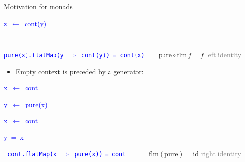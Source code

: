 \documentclass[english]{beamer}
\newenvironment{lyxcode}
   {\par\begin{list}{}{
     \setlength{\rightmargin}{\leftmargin}
     \setlength{\listparindent}{0pt}%
     \raggedright
     \setlength{\itemsep}{0pt}
     \setlength{\parsep}{0pt}
     \normalfont\ttfamily}%
    \def\{{\char`\{}
    \def\}{\char`\}}
    \def\textasciitilde{\char`\~}
    \item[]}
   {\end{list}}
\begin{document}
\begin{frame}{Motivation for monads}
\begin{minipage}[c][1\totalheight][t]{0.4\columnwidth}
\begin{lyxcode}
\textcolor{blue}{\footnotesize{}z~$\leftarrow$~cont(y)}{\footnotesize \par}
\end{lyxcode}
%
\end{minipage}\texttt{\textcolor{blue}{\footnotesize{}\hfill{}\medskip{}
}}{\footnotesize \par}

\texttt{\textcolor{blue}{\footnotesize{}pure(x).flatMap(y $\Rightarrow$
cont(y)) = cont(x)}}$\quad\quad\text{pure}\circ\text{flm}\,f=f$ \textcolor{gray}{\textendash{}
left identity}
\begin{itemize}
\item Empty context is preceded by a generator:
\end{itemize}
\texttt{\textcolor{blue}{\footnotesize{}}}%
\begin{minipage}[c][1\totalheight][t]{0.49\columnwidth}%
\begin{lyxcode}
\textcolor{blue}{\footnotesize{}x~$\leftarrow$~cont}{\footnotesize \par}

\textcolor{blue}{\footnotesize{}y~$\leftarrow$~pure(x)}{\footnotesize \par}
\end{lyxcode}
%
\end{minipage}\texttt{\textcolor{blue}{\footnotesize{}\hfill{}}}%
\begin{minipage}[c][1\totalheight][t]{0.49\columnwidth}%
\begin{lyxcode}
\textcolor{blue}{\footnotesize{}x~$\leftarrow$~cont}{\footnotesize \par}

\textcolor{blue}{\footnotesize{}y~=~x}{\footnotesize \par}
\end{lyxcode}
%
\end{minipage}\texttt{\textcolor{blue}{\footnotesize{}\hfill{}\medskip{}
cont.flatMap(x $\Rightarrow$ pure(x))}} \texttt{\textcolor{blue}{\footnotesize{}=
cont}} $\quad\quad\quad\text{flm}\left(\text{pure}\right)=\text{id}$
\textcolor{gray}{\textendash{} right identity}
\end{frame}
\end{document}
